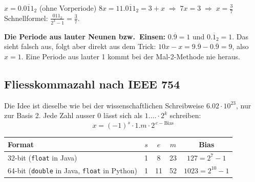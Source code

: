\begin{beispiel}{$x = 0.\overline{011}_2$ (ohne Vorperiode)}
  $8x = 11.\overline{011}_2 = 3 + x \;\Rightarrow\; 7x = 3 \;\Rightarrow\; x = \frac37$
  \qquad Schnellformel: $\frac{011_2}{2^3 - 1} = \frac37$.
\end{beispiel}

\begin{fehler}
  \textbf{Die Periode aus lauter Neunen bzw.\ Einsen:} $0.\overline{9} = 1$ und
  $0.\overline{1}_2 = 1$. Das sieht falsch aus, folgt aber direkt aus dem Trick:
  $10x - x = 9.\overline9 - 0.\overline9 = 9$, also $x = 1$.
  Eine Periode aus lauter 1 kommt bei der Mal-2-Methode nie heraus.
\end{fehler}

\subsection*{Fliesskommazahl nach IEEE 754}
Die Idee ist dieselbe wie bei der wissenschaftlichen Schreibweise $6.02 \cdot 10^{23}$,
nur zur Basis 2. Jede Zahl ausser 0 lässt sich als $1.\ldots \cdot 2^k$ schreiben:
\[
  x = (-1)^{s} \cdot 1.m \cdot 2^{\,e - \text{Bias}}
\]

\begin{center}
\end{center}

\begin{center}
  \renewcommand{\arraystretch}{1.2}
  \begin{tabular}{lcccc}
    \toprule
    Format & $s$ & $e$ & $m$ & Bias \\
    \midrule
    32-bit (\texttt{float} in Java)  & 1 & 8  & 23 & $127 = 2^7 - 1$ \\
    64-bit (\texttt{double} in Java, \texttt{float} in Python) & 1 & 11 & 52 & $1023 = 2^{10} - 1$ \\
    \bottomrule
  \end{tabular}
\end{center}

